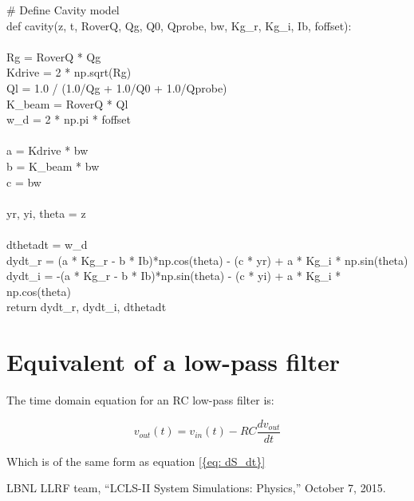 \documentclass[a4paper,12pt]{article}
\begin{document}
{\selectfont\small
\# Define Cavity model
\\def cavity(z, t, RoverQ, Qg, Q0, Qprobe, bw, Kg\_r, Kg\_i, Ib,
          foffset):
\\
\\        Rg = RoverQ * Qg
\\        Kdrive = 2 * np.sqrt(Rg)
\\        Ql = 1.0 / (1.0/Qg + 1.0/Q0 + 1.0/Qprobe)
\\        K\_beam = RoverQ * Ql
\\        w\_d = 2 * np.pi * foffset
\\
\\        a = Kdrive * bw
\\        b = K\_beam * bw
\\        c = bw
\\
\\        yr, yi, theta = z
\\
\\        dthetadt = w\_d
\\        dydt\_r = (a * Kg\_r - b * Ib)*np.cos(theta) - (c * yr) + a * Kg\_i * np.sin(theta)
\\        dydt\_i = -(a * Kg\_r - b * Ib)*np.sin(theta) - (c * yi) + a * Kg\_i * np.cos(theta)
\\        return dydt\_r, dydt\_i, dthetadt
}

\newpage
\section{Equivalent of a low-pass filter}
The time domain equation for an RC low-pass filter is:

\begin{equation}
  v_{out}(t) = v_{in}(t)-RC\frac{dv_{out}}{dt} 
\label{eq: RC time domain}
\end{equation}

Which is of the same form as equation \ref{{eq: dS_dt}}

\newpage
\begin{thebibliography}{19}   %
LBNL LLRF team, ``LCLS-II System Simulations: Physics,''
October 7, 2015.
\end{thebibliography}
\end{document}
